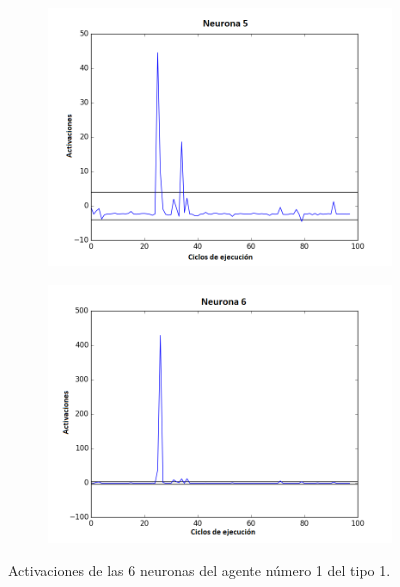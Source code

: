 \begin{figure}[!h]
\begin{subfigure}{0.33\textwidth}
  \includegraphics[width=\linewidth]{Imagenes/Agente1Activaciones/Agente0/Neurona4}
\end{subfigure}\hfil %
\begin{subfigure}{0.33\textwidth}
  \includegraphics[width=\linewidth]{Imagenes/Agente1Activaciones/Agente0/Neurona5}
\end{subfigure}
\caption{Activaciones de las 6 neuronas del agente número 1 del tipo 1.}
\end{figure}

